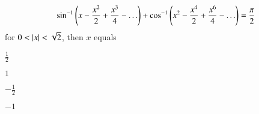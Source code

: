 \begin{enumerate}[label=\thesubsection.\arabic*,ref=\thesubsection.\theenumi]
\begin{align*}
\sin ^{-1}\left(x-\frac{x^2}{2}+\frac{x^3}{4}-\ldots\right)+ \cos ^{-1}\left(x^2-\frac{x^4}{2}+\frac{x^6}{4}-\ldots\right)=\frac{\pi}{2}
\end{align*}
for $0<\left\vert x\right\vert<\sqrt{2}$, then $x$ equals 
\hfill {}
\begin{enumerate}
\begin{multicols}{4}
\item $\frac{1}{2}$
%
\item $1$ 
\item $-\frac{1}{2}$ 
%
\item $-1$
\end{multicols}
\end{enumerate}
\end{enumerate}
